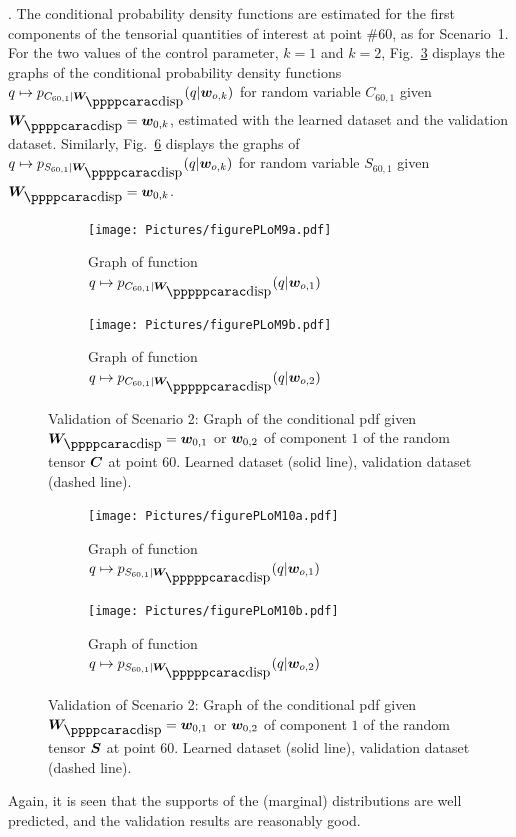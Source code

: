 .
%
The conditional probability density functions are estimated for the first components of the tensorial quantities of interest at point $\# 60$, as for Scenario~1.
%
For the two values of the control parameter, $k=1$ and $k=2$, Fig.~\ref{fig:figurePLoM9} displays the graphs of the conditional probability density functions $q\mapsto p_{ C_{60,1} \vert \bfW_\dispp } (q \vert \bfw_{o,k})$ for random variable $C_{60,1}$ given $\bfW_\dispp =\bfw_{0,k}$, estimated with the learned dataset and the validation dataset. Similarly, Fig.~\ref{fig:figurePLoM10} displays the graphs of $q\mapsto p_{ S_{60,1} \vert \bfW_\dispp } (q \vert \bfw_{o,k})$ for random variable $S_{60,1}$ given $\bfW_\dispp =\bfw_{0,k}$.
\begin{figure}[!htb]
    \centering
    \begin{subfigure}[b]{0.45\textwidth}
    \centering
        \texttt{[image: Pictures/figurePLoM9a.pdf]}
        \caption{Graph of function $q\mapsto p_{ C_{60,1} \vert \bfW_\disppp } (q \vert \bfw_{o,1})$}
        \label{fig:figurePLoM9a}
    \end{subfigure}
    \centering
    \begin{subfigure}[b]{0.45\textwidth}
    \centering
        \texttt{[image: Pictures/figurePLoM9b.pdf]}
        \caption{Graph of function $q\mapsto p_{ C_{60,1} \vert \bfW_\disppp } (q \vert \bfw_{o,2})$}
        \label{fig:figurePLoM9b}
    \end{subfigure}
    \caption{Validation of Scenario 2: Graph of the conditional pdf given $\bfW_\dispp =\bfw_{0,1}$ or ${\boldsymbol{w}}_{0,2}$ of component $1$ of the random tensor ${\boldsymbol{C}}$ at point $60$. Learned dataset (solid line), validation dataset (dashed line).}
    \label{fig:figurePLoM9}
\end{figure}
%
\begin{figure}[!htb]
    \centering
    \begin{subfigure}[b]{0.45\textwidth}
    \centering
        \texttt{[image: Pictures/figurePLoM10a.pdf]}
        \caption{Graph of function $q\mapsto p_{ S_{60,1} \vert \bfW_\disppp } (q \vert \bfw_{o,1})$}
        \label{fig:figurePLoM10a}
    \end{subfigure}
    \centering
    \begin{subfigure}[b]{0.45\textwidth}
    \centering
        \texttt{[image: Pictures/figurePLoM10b.pdf]}
        \caption{Graph of function $q\mapsto p_{ S_{60,1} \vert \bfW_\disppp } (q \vert \bfw_{o,2})$}
        \label{fig:figurePLoM10b}
    \end{subfigure}
    \caption{Validation of Scenario 2: Graph of the conditional pdf given $\bfW_\dispp =\bfw_{0,1}$ or ${\boldsymbol{w}}_{0,2}$ of component $1$ of the random tensor ${\boldsymbol{S}}$ at point $60$. Learned dataset (solid line), validation dataset (dashed line).}
    \label{fig:figurePLoM10}
\end{figure}
Again, it is seen that the supports of the (marginal) distributions are well predicted, and the validation results are reasonably good.

